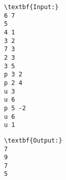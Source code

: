 \begin{verbatim}
\textbf{Input:}
6 7 
5 
4 1 
3 2 
7 3 
2 3 
3 5 
p 3 2 
p 2 4 
u 3 
u 6 
p 5 -2 
u 6 
u 1
\end{verbatim}
\begin{verbatim}
\textbf{Output:}
7 
9
7
5\end{verbatim}